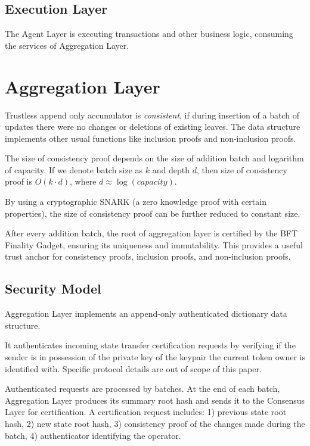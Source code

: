 \documentclass{llncs}
\begin{document}
\subsection{Execution Layer}

The Agent Layer is executing transactions and other business logic, consuming the services of Aggregation Layer.


\section{Aggregation Layer}

Trustless append only accumulator is \emph{consistent}, if during insertion of a batch of updates there were no changes or deletions of existing leaves. The data structure implements other usual functions like inclusion proofs and non-inclusion proofs.

The size of consistency proof depends on the size of addition batch and logarithm of capacity. If we denote batch size as $k$ and depth $d$, then size of consistency proof is $O(k \cdot d)$, where $d \approx \log(capacity)$.

By using a cryptographic SNARK (a zero knowledge proof with certain properties), the size of consistency proof can be further reduced to constant size.

After every addition batch, the root of aggregation layer is certified by the BFT Finality Gadget, ensuring its uniqueness and immutability. This provides a useful trust anchor for consistency proofs, inclusion proofs, and non-inclusion proofs.


\subsection{Security Model}

Aggregation Layer implements an append-only authenticated dictionary data structure.

It authenticates incoming state transfer certification requests by verifying if the sender is in possession of the private key of the keypair the current token owner is identified with. Specific protocol details are out of scope of this paper.

Authenticated requests are processed by batches. At the end of each batch, Aggregation Layer produces its summary root hash and sends it to the Consensus Layer for certification. A certification request includes: 1) previous state root hash, 2) new state root hash, 3) consistency proof of the changes made during the batch, 4) authenticator identifying the operator.
\end{document}
